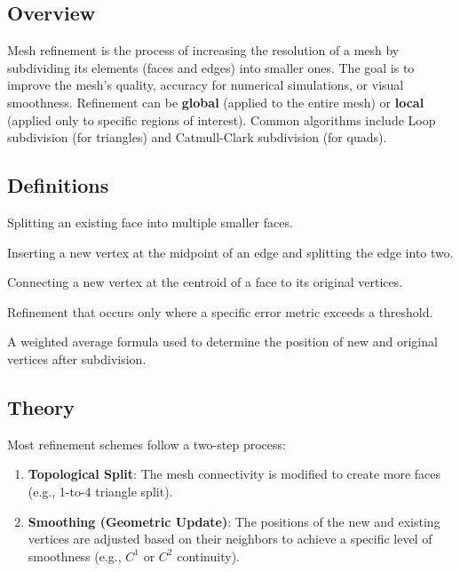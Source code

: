 \subsection{Overview}
Mesh refinement is the process of increasing the resolution of a mesh by subdividing its elements (faces and edges) into smaller ones. The goal is to improve the mesh's quality, accuracy for numerical simulations, or visual smoothness\cite{loop1987,catmull1978}. Refinement can be \textbf{global} (applied to the entire mesh) or \textbf{local} (applied only to specific regions of interest). Common algorithms include Loop subdivision (for triangles) and Catmull-Clark subdivision (for quads).

\subsection{Definitions}
\begin{definition}[Subdivision]\label{def:subdivision}
Splitting an existing face into multiple smaller faces.
\end{definition}

\begin{definition}\label{def:edge_split}
Inserting a new vertex at the midpoint of an edge and splitting the edge into two.
\end{definition}

\begin{definition}\label{def:face_split}
Connecting a new vertex at the centroid of a face to its original vertices.
\end{definition}

\begin{definition}\label{def:adaptive_refinement}
Refinement that occurs only where a specific error metric exceeds a threshold.
\end{definition}

\begin{definition}[Stencil]\label{def:stencil}
A weighted average formula used to determine the position of new and original vertices after subdivision.
\end{definition}

\subsection{Theory}
Most refinement schemes follow a two-step process:
\begin{enumerate}
\item \textbf{Topological Split}: The mesh connectivity is modified to create more faces (e.g., 1-to-4 triangle split).
\item \textbf{Smoothing (Geometric Update)}: The positions of the new and existing vertices are adjusted based on their neighbors to achieve a specific level of smoothness (e.g., $C^1$ or $C^2$ continuity).
\end{enumerate}

